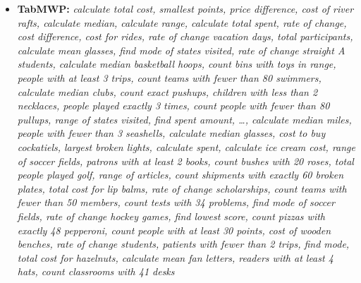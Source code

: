 \begin{itemize}[noitemsep, topsep=0pt]
    \item \textbf{TabMWP:}  \textit{calculate total cost, smallest points, price difference, cost of river rafts, calculate median, calculate range, calculate total spent, rate of change, cost difference, cost for rides, rate of change vacation days, total participants, calculate mean glasses, find mode of states visited, rate of change straight A students, calculate median basketball hoops, count bins with toys in range, people with at least 3 trips, count teams with fewer than 80 swimmers, calculate median clubs, count exact pushups, children with less than 2 necklaces, people played exactly 3 times, count people with fewer than 80 pullups, range of states visited, find spent amount, \dots, calculate median miles, people with fewer than 3 seashells, calculate median glasses, cost to buy cockatiels, largest broken lights, calculate spent, calculate ice cream cost, range of soccer fields, patrons with at least 2 books, count bushes with 20 roses, total people played golf, range of articles, count shipments with exactly 60 broken plates, total cost for lip balms, rate of change scholarships, count teams with fewer than 50 members, count tests with 34 problems, find mode of soccer fields, rate of change hockey games, find lowest score, count pizzas with exactly 48 pepperoni, count people with at least 30 points, cost of wooden benches, rate of change students, patients with fewer than 2 trips, find mode, total cost for hazelnuts, calculate mean fan letters, readers with at least 4 hats, count classrooms with 41 desks}
\end{itemize}

